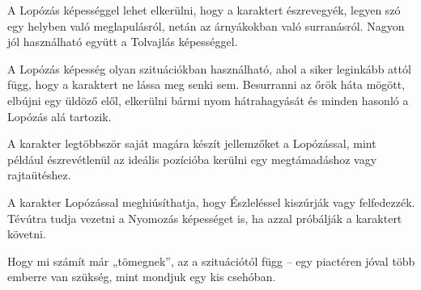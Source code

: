 
A Lopózás képességgel lehet elkerülni, hogy a karaktert észrevegyék, legyen szó egy helyben való meglapulásról, netán az árnyákokban való surranásról. Nagyon jól használható együtt a Tolvajlás képességgel.

\overcome A Lopózás képesség olyan szituációkban használható, ahol a siker leginkább attól függ, hogy a karaktert ne lássa meg senki sem. Besurranni az őrök háta mögött, elbújni egy üldöző elől, elkerülni bármi nyom hátrahagyását és minden hasonló a Lopózás alá tartozik.

\advantage A karakter legtöbbször saját magára készít jellemzőket a Lopózással, mint például észrevétlenül az ideális pozícióba kerülni egy megtámadáshoz vagy rajtaütéshez.

\noattack

 A karakter Lopózással meghiúsíthatja, hogy Észleléssel kiszúrják vagy felfedezzék. Tévútra tudja vezetni a Nyomozás képességet is, ha azzal próbálják a karaktert követni.


Hogy mi számít már „tömegnek”, az a szituációtól függ -- egy piactéren jóval több emberre van szükség, mint mondjuk egy kis csehóban.


